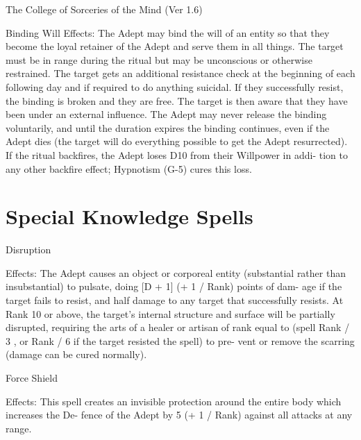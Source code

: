 \begin{Chapter}{The College of Sorceries of the Mind (Ver 1.6)}
\begin{ritual}[Q-1]{Binding Will }
Effects:  The  Adept  may  bind  the  will  of  an  entity 
so that they become the loyal retainer of the Adept 
and serve them in all things. The target must be in 
range  during  the  ritual  but  may  be  unconscious  or 
otherwise  restrained.  The  target  gets  an  additional 
resistance check at the beginning of each following 
day and if required to do anything suicidal. If they 
successfully  resist,  the  binding  is  broken  and  they 
are  free.  The  target  is  then  aware  that  they  have 
been  under  an  external  influence.  The  Adept  may 
never release the binding voluntarily, and until the 
duration  expires the binding  continues,  even  if the 
Adept  dies  (the  target  will  do  everything  possible 
to get the Adept resurrected). If the ritual backfires, 
the Adept loses D10 from their Willpower in addi-
tion to any other backfire effect; Hypnotism (G-5) 
cures this loss. 

\end{ritual}

\section{Special Knowledge Spells}

\begin{spell}[S-1]{Disruption }

Effects:  The  Adept  causes  an  object  or  corporeal 
entity  (substantial  rather  than  insubstantial)  to 
pulsate, doing [D + 1] (+ 1 / Rank) points of dam-
age  if  the  target  fails  to  resist,  and half  damage  to 
any  target  that  successfully  resists.  At  Rank  10  or 
above,  the  target’s  internal  structure  and  surface 
will  be  partially  disrupted,  requiring  the  arts  of  a 
healer  or  artisan  of  rank  equal  to  (spell  Rank  /  3 , 
or  Rank  /  6  if  the  target  resisted  the  spell)  to  pre-
vent or remove the scarring (damage can be cured 
normally). 

\end{spell}

\begin{spell}[S-2]{Force Shield }

Effects:  This  spell  creates  an  invisible  protection 
around  the  entire  body  which  increases  the  De-
fence  of  the  Adept  by  5  (+  1  /  Rank)  against  all 
attacks at any range. 


\end{spell}
\end{Chapter}
